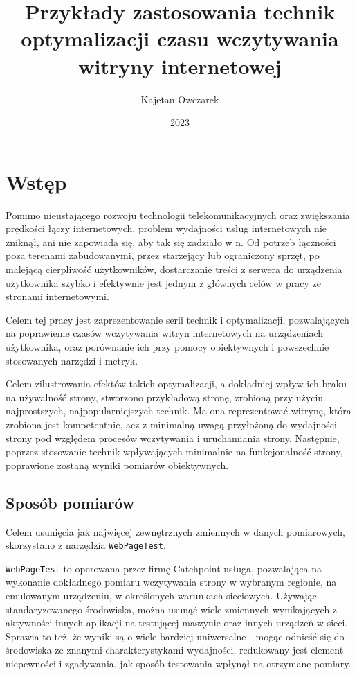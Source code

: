 \documentclass[licencjacka]{pracadypl}
\author{Kajetan Owczarek}
\title{Przykłady zastosowania technik optymalizacji czasu wczytywania witryny internetowej}
\date{2023}
\begin{document}
\maketitle
\tableofcontents
\newpage



\chapter{Wstęp}

Pomimo nieustającego rozwoju technologii telekomunikacyjnych oraz zwiększania prędkości łączy internetowych, problem wydajności usług internetowych nie zniknął, ani nie zapowiada się, aby tak się zadziało w n. Od potrzeb łączności poza terenami zabudowanymi, przez starzejący lub ograniczony sprzęt, po malejącą cierpliwość użytkowników, dostarczanie treści z serwera do urządzenia użytkownika szybko i efektywnie jest jednym z głównych celów w pracy ze stronami internetowymi.

Celem tej pracy jest zaprezentowanie serii technik i optymalizacji, pozwalających na poprawienie czasów wczytywania witryn internetowych na urządzeniach użytkownika, oraz porównanie ich przy pomocy obiektywnych i powszechnie stosowanych narzędzi i metryk.

Celem zilustrowania efektów takich optymalizacji, a dokładniej wpływ ich braku na używalność strony, stworzono przykładową stronę, zrobioną przy użyciu najprostszych, najpopularniejszych technik. Ma ona reprezentować witrynę, która zrobiona jest kompetentnie, acz z minimalną uwagą przyłożoną do wydajności strony pod względem procesów wczytywania i uruchamiania strony. Następnie, poprzez stosowanie technik wpływających minimalnie na funkcjonalność strony, poprawione zostaną wyniki pomiarów obiektywnych.

\section{Sposób pomiarów}
Celem usunięcia jak najwięcej zewnętrznych zmiennych w danych pomiarowych,
skorzystano z narzędzia \texttt{WebPageTest}.

\texttt{WebPageTest} to operowana przez firmę Catchpoint usługa, pozwalająca na wykonanie dokładnego pomiaru wczytywania strony w wybranym regionie, na emulowanym urządzeniu, w określonych warunkach sieciowych. Używając standaryzowanego środowiska, można usunąć wiele zmiennych wynikających z aktywności innych aplikacji na testującej maszynie oraz innych urządzeń w sieci. Sprawia to też, że wyniki są o wiele bardziej uniwersalne - mogąc odnieść się do środowiska ze znanymi charakterystykami wydajności, redukowany jest element niepewności i zgadywania, jak sposób testowania wpłynął na otrzymane pomiary. 
\end{document}
